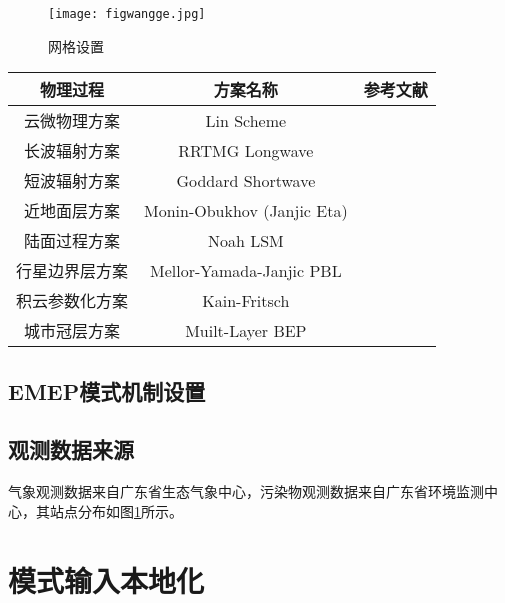 \documentclass[a4paper]{article}
\begin{document}
\begin{figure}[!htb]
\centering\texttt{[image: figwangge.jpg]} 
\caption{网格设置}\label{wangge}
\end{figure} 

\begin{threeparttable}[!htb]\small%
\centering
\caption{WRF物理参数化方案}\label{physicsschemes}
\begin{tabular}{ccc}
\toprule 
物理过程 & 方案名称 & 参考文献 \\ %
\midrule
云微物理方案 & Lin Scheme & \citep{lin1983bulk} \\
长波辐射方案 & RRTMG Longwave & \citep{iacono2008radiative} \\
短波辐射方案 & Goddard Shortwave & \citep{chou2001thermal} \\
近地面层方案 & Monin-Obukhov (Janjic Eta) & \citep{janjic1994step} \\
陆面过程方案 & Noah LSM & \citep{mukul2004implementation} \\
行星边界层方案 & Mellor-Yamada-Janjic PBL & \citep{janjic1994step} \\
积云参数化方案 & Kain-Fritsch & \citep{kain1993convective} \\
城市冠层方案 & Muilt-Layer BEP & \citep{salamanca2010new} \\
\bottomrule
\end{tabular}
\end{threeparttable}

\subsection{EMEP模式机制设置}
 
\subsection{观测数据来源}
气象观测数据来自广东省生态气象中心，污染物观测数据来自广东省环境监测中心，其站点分布如图\ref{}所示。

\section{模式输入本地化}
\end{document}
